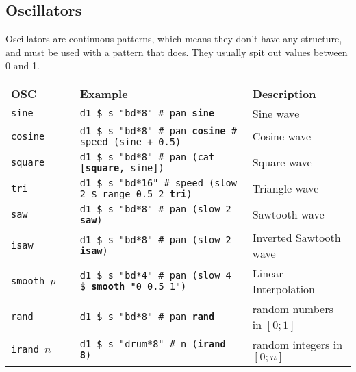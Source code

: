 \documentclass[8pt]{extarticle} %
\begin{document}
\begin{multicols}{2}
		
		\section{Oscillators}
		
		Oscillators are continuous patterns, which means they don't have any structure, and must be used with a pattern that does. They usually spit out values between 0 and 1. \\ \vspace{5pt}
	 	{\small
		\begin{tabular}{L{0.2\linewidth} L{0.5\linewidth} L{0.3\linewidth} }
			\small\bf OSC & \small\bf Example & \small\bf Description \\ 
			\tt sine & \tt d1 \$ s "bd*8" \# pan {\bf sine} & Sine wave \\
			\tt cosine & \tt d1 \$ s "bd*8" \# pan {\bf cosine} \# speed (sine + 0.5) & Cosine wave \\
			\tt square & \tt d1 \$ s "bd*8" \# pan (cat [{\bf square}, sine]) & Square wave \\
			\tt tri & \tt d1 \$ s "bd*16" \# speed (slow 2 \$ range 0.5 2 {\bf tri}) & Triangle wave \\
			\tt saw & \tt d1 \$ s "bd*8" \# pan (slow 2 {\bf saw}) & Sawtooth wave \\
			\tt isaw & \tt d1 \$ s "bd*8" \# pan (slow 2 {\bf isaw}) & Inverted Sawtooth wave \\
			\tt smooth $p$ & \tt d1 \$ s "bd*4" \# pan (slow 4 \$ {\bf smooth} "0 0.5 1") & Linear Interpolation \\
			\tt rand & \tt d1 \$ s "bd*8" \# pan {\bf rand} & random numbers in $[0;1]$\\
			\tt irand $n$ & \tt d1 \$ s "drum*8" \# n ({\bf irand 8}) & random integers in $[0;n]$ 
		\end{tabular}
		}
					

\end{multicols}
\end{document}
